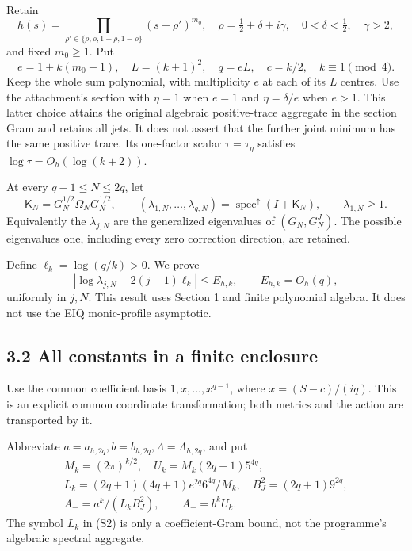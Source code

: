 \documentclass[11pt]{article}
\begin{document}
Retain \[
h(s)=\prod_{\rho'\in\{\rho,\bar\rho,1-\rho,1-\bar\rho\}}
(s-\rho')^{m_0},\quad
\rho=\tfrac12+\delta+i\gamma,\quad0<\delta<\tfrac12,\quad\gamma>2,
\] and fixed \(m_0\ge1\). Put \[
e=1+k(m_0-1),\quad L=(k+1)^2,\quad q=eL,\quad c=k/2,\quad
k\equiv1\pmod4.
\] Keep the whole sum polynomial, with multiplicity \(e\) at each of its \(L\) centres. Use the attachment's section with \(\eta=1\) when \(e=1\) and \(\eta=\delta/e\) when \(e>1\). This latter choice attains the original algebraic positive-trace aggregate in the section Gram and retains all jets. It does not assert that the further joint minimum has the same positive trace. Its one-factor scalar \(\tau=\tau_\eta\) satisfies \(\log\tau=O_h(\log(k+2))\).

At every \(q-1\le N\le2q\), let \[
 \mathsf K_N=G_N^{1/2}\Omega_NG_N^{1/2},
 \qquad
 (\lambda_{1,N},\ldots,\lambda_{q,N})
 =\operatorname{spec}^{\uparrow}(I+\mathsf K_N),\qquad \lambda_{1,N}\ge1.
\] Equivalently the \(\lambda_{j,N}\) are the generalized eigenvalues of \((G_N,G_N^J)\). The possible eigenvalues one, including every zero correction direction, are retained.

Define \(\ell_k=\log(q/k)>0\). We prove \[
 \boxed{
 \left|\log\lambda_{j,N}-2(j-1)\ell_k\right|
 \le E_{h,k},\qquad E_{h,k}=O_h(q),
 } \tag{S1}
\] uniformly in \(j,N\). This result uses Section 1 and finite polynomial algebra. It does not use the EIQ monic-profile asymptotic.

\subsection{3.2 All constants in a finite enclosure}\label{all-constants-in-a-finite-enclosure}

Use the common coefficient basis \(1,x,\ldots,x^{q-1}\), where \(x=(S-c)/(iq)\). This is an explicit common coordinate transformation; both metrics and the action are transported by it.

Abbreviate \(a=a_{h,2q}, b=b_{h,2q}, \Lambda=\Lambda_{h,2q}\), and put \[
\begin{gathered}
M_k=(2\pi)^{k/2},\quad
U_k=M_k(2q+1)5^{4q},\\
L_k=(2q+1)(4q+1)e^{2q}6^{4q}/M_k,\quad
B_J^2=(2q+1)9^{2q},\\
A_-=a^k/(L_kB_J^2),\qquad A_+=b^kU_k. \tag{S2}
\end{gathered}
\] The symbol \(L_k\) in (S2) is only a coefficient-Gram bound, not the programme's algebraic spectral aggregate.
\end{document}
